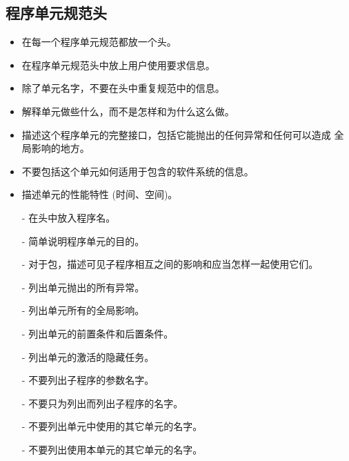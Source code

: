 \subsection{程序单元规范头}

\begin{itemize}
    \item 在每一个程序单元规范都放一个头。
    \item 在程序单元规范头中放上用户使用要求信息。
    \item 除了单元名字，不要在头中重复规范中的信息。
    \item 解释单元做些什么，而不是怎样和为什么这么做。
    \item 描述这个程序单元的完整接口，包括它能抛出的任何异常和任何可以造成
全局影响的地方。
    \item 不要包括这个单元如何适用于包含的软件系统的信息。
    \item 描述单元的性能特性 (时间、空间)。
\end{itemize}

\begin{itemize}
    \item[-] 在头中放入程序名。
    \item[-] 简单说明程序单元的目的。
    \item[-] 对于包，描述可见子程序相互之间的影响和应当怎样一起使用它们。
    \item[-] 列出单元抛出的所有异常。
    \item[-] 列出单元所有的全局影响。
    \item[-] 列出单元的前置条件和后置条件。
    \item[-] 列出单元的激活的隐藏任务。
    \item[-] 不要列出子程序的参数名字。
    \item[-] 不要只为列出而列出子程序的名字。
    \item[-] 不要列出单元中使用的其它单元的名字。
    \item[-] 不要列出使用本单元的其它单元的名字。
\end{itemize}

